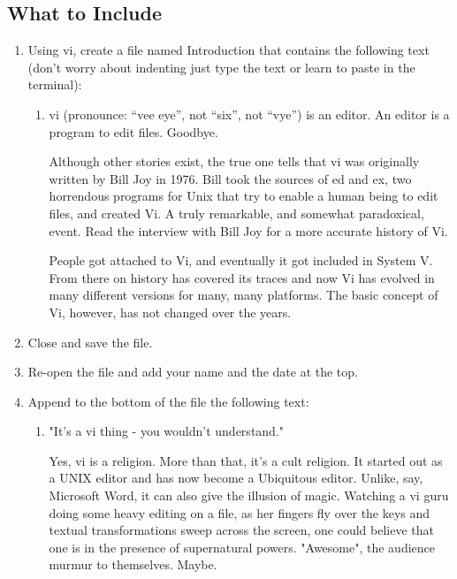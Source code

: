 \documentclass[12pt]{article}
\begin{document}
\subsection*{What to Include}
    \begin{enumerate}
        \item Using vi, create a file named Introduction that contains the following text (don’t worry about indenting just type the text or learn to paste in the terminal): 
        \begin{enumerate}[label=---,leftmargin=2em]
        \item vi (pronounce: ``vee eye'', not ``six'', not ``vye'') is an editor. An editor is a program to edit files. Goodbye.

            Although other stories exist, the true one tells that vi was originally written by Bill Joy in 1976. Bill took the sources of ed and ex, two horrendous programs for Unix that try to enable a human being to edit files, and created Vi. A truly remarkable, and somewhat paradoxical, event. Read the interview with Bill Joy for a more accurate history of Vi.

            People got attached to Vi, and eventually it got included in System V. From there on history has covered its traces and now Vi has evolved in many different versions for many, many platforms. The basic concept of Vi, however, has not changed over the years.
    \end{enumerate}


        \item Close and save the file.
        \item Re-open the file and add your name and the date at the top.
        \item Append to the bottom of the file the following text: 
            \begin{enumerate}[label=---,leftmargin=2em]
                \item"It's a vi thing - you wouldn't understand."
                
                Yes, vi is a religion. More than that, it's a cult religion. It started out as a UNIX editor and has now become a Ubiquitous editor. Unlike, say, Microsoft Word, it can also give the illusion of magic. Watching a vi guru doing some heavy editing on a file, as her fingers fly over the keys and textual transformations sweep across the screen, one could believe that one is in the presence of supernatural powers. "Awesome", the audience murmur to themselves. Maybe. \\
            \end{enumerate}


    \end{enumerate}
\end{document}
